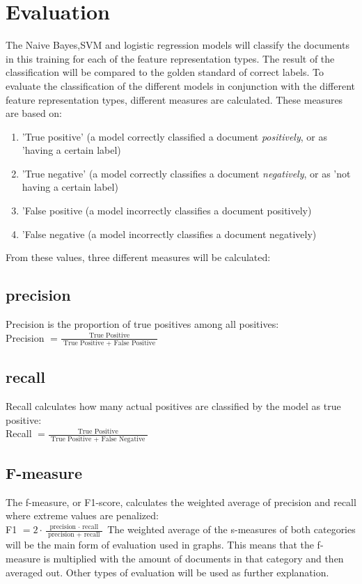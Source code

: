 \documentclass[
10pt, %
a4paper, %
oneside, %
headinclude,footinclude, %
] {book}%
\begin{document}
\section{Evaluation}


The Naive Bayes,SVM and logistic regression models will classify the documents in this training for each of the feature representation types. The result of the classification will be compared to the golden standard of correct labels. To evaluate the classification of the different models in conjunction with the different feature representation types, different measures are calculated. These measures are based on:
\begin{enumerate}
    \item 'True positive' (a model correctly classified a document \emph{positively}, or as 'having a certain label) 
    \item 'True negative' (a model correctly classifies a document \emph{negatively}, or as 'not having a certain label)
    \item 'False positive (a model incorrectly classifies a document positively)
    \item 'False negative (a model incorrectly classifies a document negatively)
\end{enumerate}
From these values, three different measures will be calculated:
\subsection{precision}
Precision is the proportion of true positives among all positives: \\
Precision \( =\frac{\text { True Positive }}{\text { True Positive }+\text { False Positive }} \)
\\
\subsection{recall}
Recall calculates how many actual positives are classified by the model as true positive: \\
Recall \( =\frac{\text { True Positive }}{\text { True Positive }+\text { False Negative }} \)

\subsection{F-measure}
The f-measure, or F1-score, calculates the weighted average of precision and recall where extreme values are penalized: \\
F1 \(= 2 \cdot \frac{\text { precision } \cdot \text { recall }}{\text { precision }+\text { recall }} \)
The weighted average of the s-measures of both categories will be the main form of evaluation used in graphs. This means that the f-measure is multiplied with the amount of documents in that category and then averaged out. Other types of evaluation will be used as further explanation. 
\\
 
\end{document}
